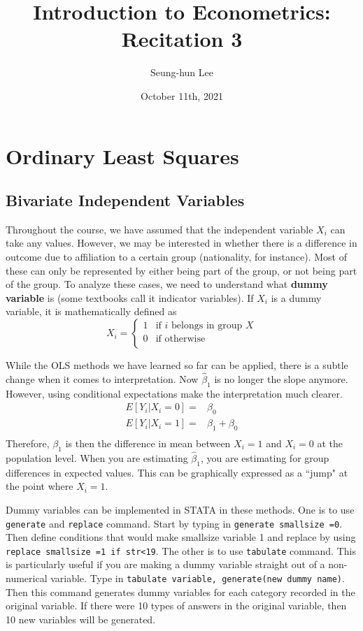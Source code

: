 \documentclass[12pt]{article}
\title{Introduction to Econometrics: Recitation 3}
\theoremstyle{definition}
\theoremstyle{property}
\theoremstyle{assumption}
\theoremstyle{example}
\theoremstyle{comment}
\begin{document}
\linespread{1.25}
\author{Seung-hun Lee}
\date{October 11th, 2021 }
\maketitle

\section{Ordinary Least Squares}
\subsection{Bivariate Independent Variables}

Throughout the course, we have assumed that the independent variable $X_i$ can take any values. However, we may be interested in whether there is a difference in outcome due to affiliation to a certain group (nationality, for instance). Most of these can only be represented by either being part of the group, or not being part of the group. To analyze these cases, we need to understand what \textbf{dummy variable} is (some textbooks call it indicator variables). If $X_i$ is a dummy variable, it is mathematically defined as
\[
X_i = \begin{cases} 1 & \text{if $i$ belongs in group $X$} \\  0 & \text{if otherwise} \\ \end{cases}
\]
\par\medskip
While the OLS methods we have learned so far can be applied, there is a subtle change when it comes to interpretation. Now $\hat{\beta}_1$ is no longer the slope anymore. However, using conditional expectations make the interpretation much clearer.
\[
\begin{aligned}
E[Y_i |X_i=0]=& \beta_0\\
E[Y_i |X_i=1]=& \beta_1+\beta_0\\
\end{aligned}
\]
Therefore, $\beta_1$ is then the difference in mean between $X_i=1$ and $X_i=0$ at the population level. When you are estimating $\hat{\beta}_1$, you are estimating for group differences in expected values. This can be graphically expressed as a ``jump" at the point where $X_i=1$. \par\medskip
Dummy variables can be implemented in STATA in these methods. One is to use \texttt{generate} and \texttt{replace} command. Start by typing in \texttt{generate smallsize =0}. Then define conditions that would make smallsize variable 1 and replace by using \texttt{replace smallsize =1 if str<19}. The other is to use \texttt{tabulate} command. This is particularly useful if you are making a dummy variable straight out of a non-numerical variable. Type in \texttt{tabulate variable, generate(new dummy name)}. Then this command generates dummy variables for each category recorded in the original variable. If there were 10 types of answers in the original variable, then 10 new variables will be generated. \par\medskip 
\end{document}
